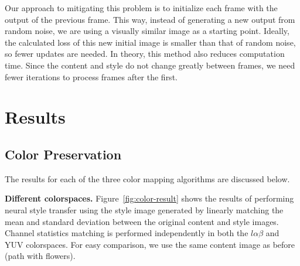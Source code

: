 \documentclass[10pt,twocolumn,letterpaper]{article}
\begin{document}
Our approach to mitigating this problem is to initialize each frame with the output of the previous frame. This way, instead of generating a new output from random noise, we are using a visually similar image as a starting point. Ideally, the calculated loss of this new initial image is smaller than that of random noise, so fewer updates are needed. In theory, this method also reduces computation time. Since the content and style do not change greatly between frames, we need fewer iterations to process frames after the first.

\section{Results}
\subsection{Color Preservation}
The results for each of the three color mapping algorithms are discussed below.

\bigbreak\noindent\textbf{Different colorspaces.}
Figure~\ref{fig:color-result} shows the results of performing neural style transfer using the style image generated by linearly matching the mean and standard deviation between the original content and style images. Channel statistics matching is performed independently in both the $l\alpha\beta$ and YUV colorspaces. For easy comparison, we use the same content image as before (path with flowers).
\end{document}
